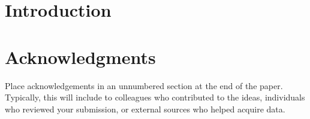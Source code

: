 \documentclass{article}
\begin{document}

\begin{abstract}
\end{abstract}

\section{Introduction}
\label{introduction}


\section*{Acknowledgments}


Place acknowledgements in an unnumbered section at the
end of the paper. Typically, this will include
to colleagues who contributed to the ideas, individuals who
reviewed your submission, or external sources who helped
acquire data.


\nocite{langley00}



\end{document}
